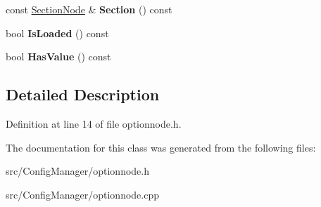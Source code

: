 \begin{DoxyCompactItemize}
\item 
const \hyperlink{class_config_manager_1_1_section_node}{Section\+Node} \& {\bfseries Section} () const \hypertarget{class_config_manager_1_1_option_node_a5f04016950d1b512d1b3efad7558da13}{}\label{class_config_manager_1_1_option_node_a5f04016950d1b512d1b3efad7558da13}

\item 
bool {\bfseries Is\+Loaded} () const \hypertarget{class_config_manager_1_1_option_node_a5c0a779da4931dab931cef2d9f9b1d70}{}\label{class_config_manager_1_1_option_node_a5c0a779da4931dab931cef2d9f9b1d70}

\item 
bool {\bfseries Has\+Value} () const \hypertarget{class_config_manager_1_1_option_node_acc9389da929330b79e78a8dcb6c66f11}{}\label{class_config_manager_1_1_option_node_acc9389da929330b79e78a8dcb6c66f11}

\end{DoxyCompactItemize}


\subsection{Detailed Description}


Definition at line 14 of file optionnode.\+h.



The documentation for this class was generated from the following files\+:\begin{DoxyCompactItemize}
\item 
src/\+Config\+Manager/optionnode.\+h\item 
src/\+Config\+Manager/optionnode.\+cpp\end{DoxyCompactItemize}

